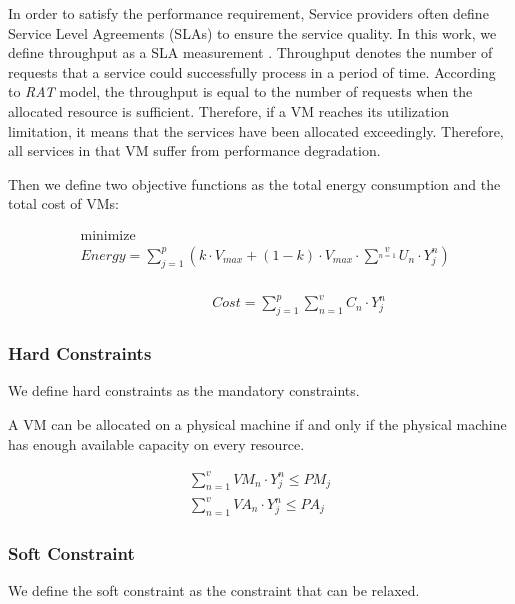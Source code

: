 In order to satisfy the performance requirement, Service providers often define Service Level Agreements (SLAs) to ensure the service quality. In this work, we define throughput as a SLA measurement \cite{SLA_metric}. 
Throughput denotes the number of requests that a service could successfully process in a period of time. According to \textit{RAT} model, the throughput is equal to the number of requests when the allocated resource is sufficient. 
Therefore, if a VM reaches its utilization limitation, it means that the services have been allocated exceedingly.
Therefore, all services in that VM suffer from 
performance degradation.


Then we define two objective functions as the total energy consumption and the total cost of VMs:

\begin{equation}
\label{eq:energy}
\begin{aligned}
& {\text{minimize}}\\
& Energy = \sum\limits_{j=1}^p (k \cdot V_{max} + (1 - k) \cdot V_{max} \cdot \sum^v\limits_{n=1} U_n \cdot Y^n_j)\\
\end{aligned}
\end{equation}

\begin{equation}
\label{eq:cost}
\begin{aligned}
& & & & & & & Cost = \sum\limits_{j=1}^p\sum\limits_{n=1}^v C_n \cdot Y^n_j
\end{aligned}
\end{equation}

\subsubsection{Hard Constraints}
We define hard constraints as the mandatory constraints.

A VM can be allocated on a physical machine if and 
only if the physical machine has enough available capacity on every resource.

\begin{equation} 
\label{eq:constraint}
\begin{aligned}
\sum\limits_{n=1}^v VM_n \cdot Y^n_j \leq PM_j\\
\sum\limits_{n=1}^v VA_n \cdot Y^n_j \leq PA_j
\end{aligned}
\end{equation}

\subsubsection{Soft Constraint}
We define the soft constraint as the constraint that can be relaxed. 

